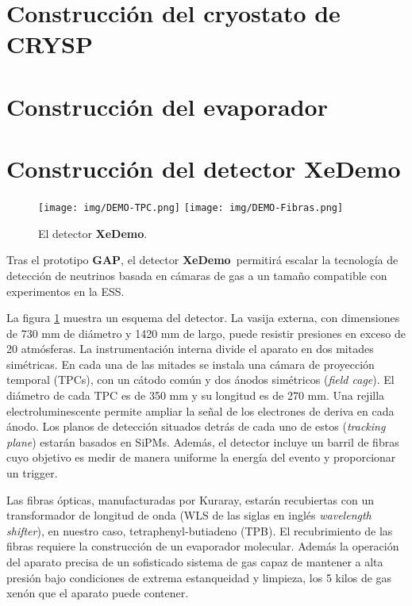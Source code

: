 \documentclass[12pt,a4paper,article]{report} %
\def\xed{{\bf XeDemo}}
\begin{document}
\section*{Construcción del cryostato de CRYSP}

\section*{Construcción del evaporador}



\section*{Construcción del detector \xed}

\begin{figure}[htbp]
\begin{center}
\texttt{[image: img/DEMO-TPC.png]}
\texttt{[image: img/DEMO-Fibras.png]}
\caption{El detector \xed.}
\label{fig:Xe-DEMO}
\end{center}
\end{figure}

Tras el prototipo {\bf GAP}, el detector 
\xed\ permitirá escalar la tecnología de detección de neutrinos basada en cámaras de gas a un tamaño compatible con experimentos en la ESS.

La figura \ref{fig:Xe-DEMO}  muestra un esquema del detector. La vasija externa, con dimensiones de 730 mm de diámetro y 1420 mm de largo, puede resistir presiones en exceso de 20 atmósferas. La instrumentación interna divide el aparato en dos mitades simétricas. En cada una de las mitades se instala una cámara de proyección temporal (TPCs), con un cátodo común y dos ánodos simétricos ({\em field cage}). El diámetro de cada TPC es de 350 mm y su longitud es de 270 mm.  Una rejilla electroluminescente permite ampliar la señal de los electrones de deriva en cada ánodo. Los planos de detección situados detrás de cada uno de estos ({\em tracking plane}) estarán basados en SiPMs. Además, el detector incluye un barril de fibras cuyo objetivo es medir de manera uniforme la energía del evento y proporcionar un trigger. 

Las fibras ópticas, manufacturadas por Kuraray, estarán recubiertas con un transformador de longitud de onda (WLS de las siglas en inglés {\em wavelength shifter}), en nuestro caso, tetraphenyl-butiadeno (TPB). El recubrimiento de las fibras requiere la construcción de un evaporador molecular. Además la operación del aparato precisa de un sofisticado sistema de gas capaz de mantener a alta presión bajo condiciones de extrema estanqueidad y limpieza, los 5 kilos de gas xenón que el aparato puede contener. 
\end{document}

